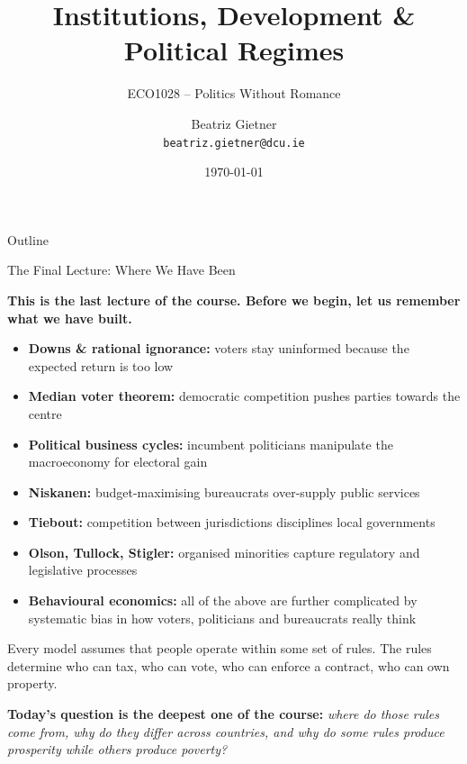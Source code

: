 \documentclass[10pt]{beamer}
\title{Institutions, Development \& Political Regimes}
\subtitle{ECO1028 -- Politics Without Romance}
\author{Beatriz Gietner\\
\texttt{beatriz.gietner@dcu.ie}}
\date{\today}
\begin{document}
\maketitle

\begin{frame}{Outline}
\tableofcontents
\end{frame}

\begin{frame}[allowframebreaks]{The Final Lecture: Where We Have Been}

\textbf{This is the last lecture of the course. Before we begin, let us remember what we have built.}

\begin{itemize}
\item \textbf{Downs \& rational ignorance:} voters stay uninformed because the expected return is too low
\item \textbf{Median voter theorem:} democratic competition pushes parties towards the centre
\item \textbf{Political business cycles:} incumbent politicians manipulate the macroeconomy for electoral gain
\item \textbf{Niskanen:} budget-maximising bureaucrats over-supply public services
\item \textbf{Tiebout:} competition between jurisdictions disciplines local governments
\item \textbf{Olson, Tullock, Stigler:} organised minorities capture regulatory and legislative processes
\item \textbf{Behavioural economics:} all of the above are further complicated by systematic bias in how voters, politicians and bureaucrats really think
\end{itemize}


\alert{Every model assumes that people operate within some set of rules.}
The rules determine who can tax, who can vote, who can enforce a contract, who can own property.


\textbf{Today's question is the deepest one of the course:} \emph{where do those rules come from, why do they differ across countries, and why do some rules produce prosperity while others produce poverty?}
\end{frame}
\end{document}
